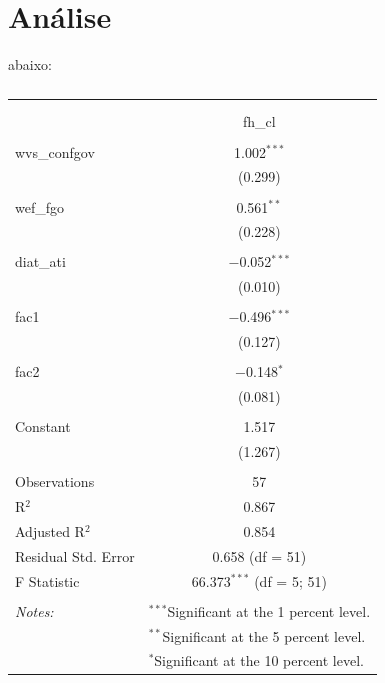 \documentclass[]{elsarticle} %
\begin{document}
\section{Análise}\label{analise}

abaixo:

\begin{table}[!htbp] \centering 
  \caption{} 
  \label{} 
\begin{tabular}{@{\extracolsep{5pt}}lc} 
\\[-1.8ex]\hline 
\hline \\[-1.8ex] 
\\[-1.8ex] & fh\_cl \\ 
\hline \\[-1.8ex] 
 wvs\_confgov & 1.002$^{***}$ \\ 
  & (0.299) \\ 
  & \\ 
 wef\_fgo & 0.561$^{**}$ \\ 
  & (0.228) \\ 
  & \\ 
 diat\_ati & $-$0.052$^{***}$ \\ 
  & (0.010) \\ 
  & \\ 
 fac1 & $-$0.496$^{***}$ \\ 
  & (0.127) \\ 
  & \\ 
 fac2 & $-$0.148$^{*}$ \\ 
  & (0.081) \\ 
  & \\ 
 Constant & 1.517 \\ 
  & (1.267) \\ 
  & \\ 
Observations & 57 \\ 
R$^{2}$ & 0.867 \\ 
Adjusted R$^{2}$ & 0.854 \\ 
Residual Std. Error & 0.658 (df = 51) \\ 
F Statistic & 66.373$^{***}$ (df = 5; 51) \\ 
\hline \\[-1.8ex] 
\textit{Notes:} & \multicolumn{1}{l}{$^{***}$Significant at the 1 percent level.} \\ 
 & \multicolumn{1}{l}{$^{**}$Significant at the 5 percent level.} \\ 
 & \multicolumn{1}{l}{$^{*}$Significant at the 10 percent level.} \\ 
\end{tabular} 
\end{table}
\end{document}
